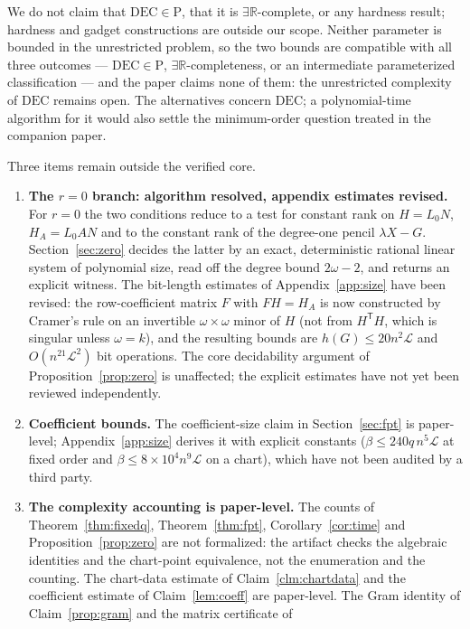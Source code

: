 \documentclass[journal]{IEEEtran}
\theoremstyle{plainn}
\theoremstyle{remark}
\begin{document}
We do not claim that $\mathrm{DEC}\in\mathrm P$, that it is $\exists\mathbb R$-complete, or any
hardness result; hardness and gadget constructions are outside our scope. Neither parameter is
bounded in the unrestricted problem, so the two bounds are compatible with all three outcomes ---
$\mathrm{DEC}\in\mathrm P$, $\exists\mathbb R$-completeness, or an intermediate parameterized
classification --- and the paper claims none of them: the unrestricted complexity of $\mathrm{DEC}$
remains open. The alternatives concern $\mathrm{DEC}$; a polynomial-time algorithm for it would
also settle the minimum-order question treated in the companion paper.

Three items remain outside the verified core.
\begin{enumerate}
\item \textbf{The $r=0$ branch: algorithm resolved, appendix estimates revised.} For $r=0$ the two conditions reduce to a test for constant rank on $H=L_0N$, $H_A=L_0AN$ and to the constant rank of the degree-one pencil $\lambda X-G$. Section~\ref{sec:zero} decides the latter by an exact, deterministic rational linear system of polynomial size, read off the degree bound $2\omega-2$, and returns an explicit witness. The bit-length estimates of Appendix~\ref{app:size} have been revised: the row-coefficient matrix $F$ with $FH=H_A$ is now constructed by Cramer's rule on an invertible $\omega\times\omega$ minor of $H$ (not from $H^{\mathsf T}H$, which is singular unless $\omega=k$), and the resulting bounds are $h(G)\le20n^2\mathcal L$ and $O(n^{21}\mathcal L^2)$ bit operations. The core decidability argument of Proposition~\ref{prop:zero} is unaffected; the explicit estimates have not yet been reviewed independently.
\item \textbf{Coefficient bounds.} The coefficient-size claim in Section~\ref{sec:fpt} is paper-level; Appendix~\ref{app:size} derives it with explicit constants ($\beta\le240q\,n^5\mathcal L$ at fixed order and $\beta\le8\times10^4n^9\mathcal L$ on a chart), which have not been audited by a third party.
\item \textbf{The complexity accounting is paper-level.} The counts of Theorem~\ref{thm:fixedq},
Theorem~\ref{thm:fpt}, Corollary~\ref{cor:time} and Proposition~\ref{prop:zero} are not formalized:
the artifact checks the algebraic identities and the chart-point equivalence, not the enumeration and
the counting. The chart-data
estimate of Claim~\ref{clm:chartdata} and the coefficient estimate of Claim~\ref{lem:coeff} are
paper-level. The Gram identity of Claim~\ref{prop:gram} and the matrix certificate of

\end{enumerate}
\end{document}
